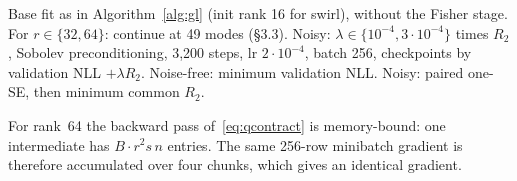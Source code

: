 \documentclass[11pt]{article}
\theoremstyle{definition}
\theoremstyle{remark}
\begin{document}
\begin{algorithm}[H]
\caption{High-capacity recipe for cryo-EM and swirl--pretzel (\texttt{refine\_cryoem\_continuity.py}, \texttt{swirl\_fits.py})}
\label{alg:hi}
\begin{algorithmic}[1]
\STATE Base fit as in Algorithm~\ref{alg:gl} (init rank 16 for swirl), without the Fisher stage.
\STATE For $r\in\{32,64\}$: continue at 49 modes (\S3.3). Noisy: $\lambda\in\{10^{-4},3\cdot10^{-4}\}$ times $R_2$, Sobolev preconditioning, 3{,}200 steps, lr $2\cdot10^{-4}$, batch 256, checkpoints by validation NLL $+\lambda R_2$.
\STATE Noise-free: minimum validation NLL. Noisy: paired one-SE, then minimum common $R_2$.
\end{algorithmic}
\end{algorithm}

For rank~64 the backward pass of~\eqref{eq:qcontract} is memory-bound: one intermediate has
$B\cdot r^2 s\,n$ entries. The same 256-row minibatch gradient is therefore accumulated over four chunks, which gives an
identical gradient.





\end{document}
